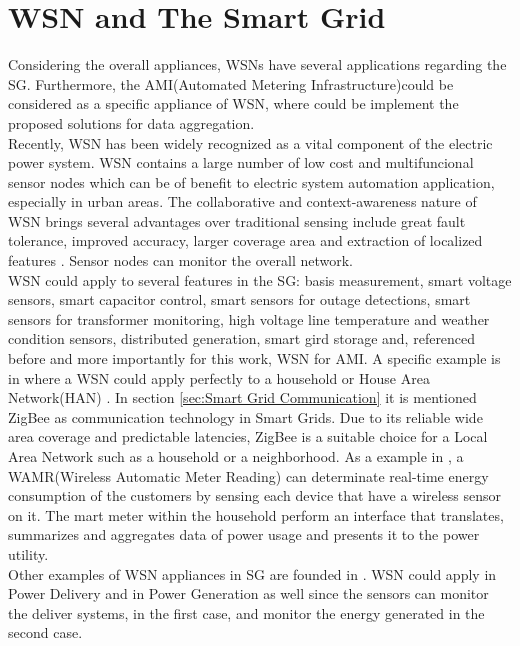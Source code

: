 \section{WSN and  The Smart Grid}
Considering the overall appliances, WSNs have several applications regarding the SG. Furthermore, the AMI(Automated Metering Infrastructure)could be considered as a specific appliance of WSN, where could be implement the proposed solutions for data aggregation.\\
Recently, WSN has been widely  recognized as a vital component of the electric power system\cite{journals/ijdsn/Liu12}. WSN contains a large number of low cost and multifuncional sensor nodes which can be of benefit to electric system automation application, especially in urban areas\cite{RePEc:eee:rensus:v:15:y:2011:i:6:p:2736-2742}. The collaborative and context-awareness nature of WSN brings several advantages over traditional sensing include great fault tolerance, improved accuracy, larger coverage area and extraction of localized features \cite{journals/ijdsn/Liu12}. Sensor nodes can monitor the overall network.\\
WSN could apply to several features in the SG: basis measurement, smart voltage sensors, smart capacitor control, smart sensors for outage detections, smart sensors for transformer monitoring, high voltage line temperature and weather condition sensors, distributed generation, smart gird storage and, referenced before and more importantly for this work, WSN for AMI.
A specific example is in \cite{journals/ijdsn/Liu12} where a WSN could apply perfectly to a household or House Area Network(HAN) . In section \ref{sec:Smart Grid Communication} it is mentioned ZigBee as communication technology in Smart Grids. Due to its reliable wide area coverage and predictable latencies, ZigBee is a suitable choice for a Local Area Network such as a household or a neighborhood. As a example in \cite{journals/ijdsn/Liu12}, a WAMR(Wireless Automatic Meter Reading) can determinate real-time energy consumption of the customers by sensing each device that have a wireless sensor on it. The mart meter within the household perform an interface that translates, summarizes and aggregates data of power usage and presents it to the power utility.\\ 
Other examples of WSN appliances in SG are founded in \cite{journals/ijdsn/Liu12}. WSN could apply in Power Delivery and in Power Generation as well since the sensors can monitor the deliver systems, in the first case, and monitor the energy generated in the second case.


